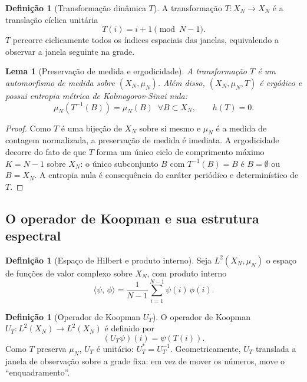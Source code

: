 \documentclass[12pt,a4paper]{article}
\newtheorem{lemma}[theorem]{Lema}
\theoremstyle{definition}
\newtheorem{definition}[theorem]{Definição}
\newcommand{\ip}[2]{\langle #1,\, #2 \rangle}
\begin{document}
	\begin{definition}[Transformação dinâmica $T$]
		A transformação $T: X_N \to X_N$ é a translação cíclica unitária
		\[
		T(i) = i + 1 \pmod{N-1}.
		\]
		$T$ percorre ciclicamente todos os índices espaciais das janelas,
		equivalendo a observar a janela seguinte na grade.
	\end{definition}
	
	\begin{lemma}[Preservação de medida e ergodicidade]
		\label{lem:ergodico}
		A transformação $T$ é um automorfismo de medida sobre $(X_N, \mu_N)$.
		Além disso, $(X_N, \mu_N, T)$ é ergódico e possui entropia métrica de
		Kolmogorov-Sinai nula:
		\[
		\mu_N(T^{-1}(B)) = \mu_N(B)\;\;\forall B \subset X_N,\qquad h(T) = 0.
		\]
	\end{lemma}
	
	\begin{proof}
		Como $T$ é uma bijeção de $X_N$ sobre si mesmo e $\mu_N$ é a medida
		de contagem normalizada, a preservação de medida é imediata. A
		ergodicidade decorre do fato de que $T$ forma um único ciclo de
		comprimento máximo $K = N-1$ sobre $X_N$: o único subconjunto $B$ com
		$T^{-1}(B) = B$ é $B = \emptyset$ ou $B = X_N$. A entropia nula é
		consequência do caráter periódico e determinístico de $T$.
	\end{proof}
	
	\subsection{O operador de Koopman e sua estrutura espectral}
	
	\begin{definition}[Espaço de Hilbert e produto interno]
		Seja $L^2(X_N, \mu_N)$ o espaço de funções de valor complexo sobre
		$X_N$, com produto interno
		\[
		\ip{\psi}{\phi} = \frac{1}{N-1}\sum_{i=1}^{N-1} \psi(i)\,\overline{\phi(i)}.
		\]
	\end{definition}
	
	\begin{definition}[Operador de Koopman $U_T$]
		\label{def:koopman}
		O operador de Koopman $U_T: L^2(X_N) \to L^2(X_N)$ é definido por
		\[
		(U_T\psi)(i) = \psi(T(i)).
		\]
		Como $T$ preserva $\mu_N$, $U_T$ é unitário: $U_T^* = U_T^{-1}$.
		Geometricamente, $U_T$ translada a janela de observação sobre a
		grade fixa: em vez de mover os números, move o ``enquadramento''.
	\end{definition}
	
\end{document}
